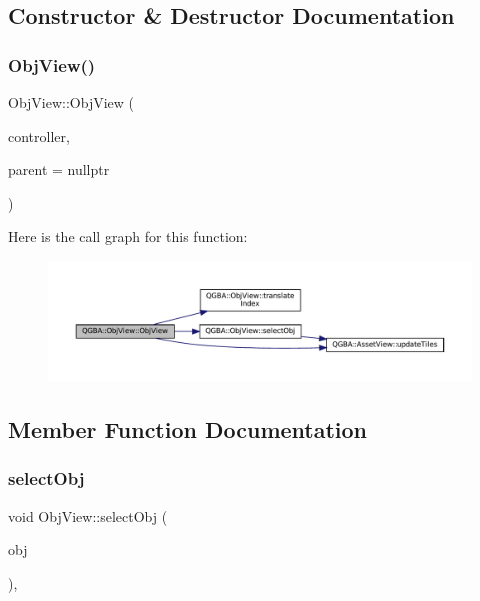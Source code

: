 \subsection{Constructor \& Destructor Documentation}
\mbox{\label{class_q_g_b_a_1_1_obj_view_a02123485e97e65030618bbca511808b7}} 
\subsubsection{\texorpdfstring{Obj\+View()}{ObjView()}}
{\footnotesize\ttfamily Obj\+View\+::\+Obj\+View (\begin{DoxyParamCaption}\item[{std\+::shared\+\_\+ptr$<$ \mbox{\hyperlink{class_q_g_b_a_1_1_core_controller}{Core\+Controller}} $>$}]{controller,  }\item[{Q\+Widget $\ast$}]{parent = {\ttfamily nullptr} }\end{DoxyParamCaption})}

Here is the call graph for this function\+:
\nopagebreak
\begin{figure}[H]
\begin{center}
\leavevmode
\includegraphics[width=350pt]{class_q_g_b_a_1_1_obj_view_a02123485e97e65030618bbca511808b7_cgraph}
\end{center}
\end{figure}


\subsection{Member Function Documentation}
\mbox{\label{class_q_g_b_a_1_1_obj_view_a2f9e25964e38bf4060fe68878bf8a963}} 
\subsubsection{\texorpdfstring{select\+Obj}{selectObj}}
{\footnotesize\ttfamily void Obj\+View\+::select\+Obj (\begin{DoxyParamCaption}\item[{\mbox{\hyperlink{ioapi_8h_a787fa3cf048117ba7123753c1e74fcd6}{int}}}]{obj }\end{DoxyParamCaption})\hspace{0.3cm}{\ttfamily [private]}, {\ttfamily [slot]}}


